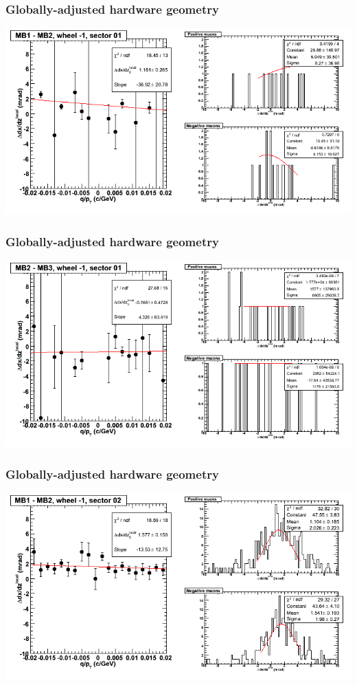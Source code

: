 \documentclass[compress]{beamer}
\begin{document}
\begin{frame}
\frametitle{Globally-adjusted hardware geometry}
\includegraphics[width=\linewidth]{NOV4_segdiffs_HW/dt13_slope_B_01_12.png}
\end{frame}

\begin{frame}
\frametitle{Globally-adjusted hardware geometry}
\includegraphics[width=\linewidth]{NOV4_segdiffs_HW/dt13_slope_B_01_23.png}
\end{frame}

\begin{frame}
\frametitle{Globally-adjusted hardware geometry}
\includegraphics[width=\linewidth]{NOV4_segdiffs_HW/dt13_slope_B_02_12.png}
\end{frame}
\end{document}
